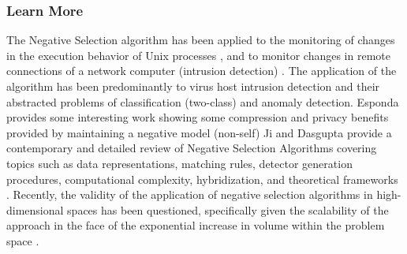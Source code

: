 % 
% 
\subsubsection{Learn More}
The Negative Selection algorithm has been applied to the monitoring of changes in the execution behavior of Unix processes \cite{Forrest1996, Hofmeyr1998}, and to monitor changes in remote connections of a network computer (intrusion detection) \cite{Hofmeyr1999, Hofmeyr1999a}. The application of the algorithm has been predominantly to virus host intrusion detection and their abstracted problems of classification (two-class) and anomaly detection.
Esponda provides some interesting work showing some compression and privacy benefits provided by maintaining a negative model (non-self) \cite{Darlington2005}
Ji and Dasgupta provide a contemporary and detailed review of Negative Selection Algorithms covering topics such as data representations, matching rules, detector generation procedures, computational complexity, hybridization, and theoretical frameworks \cite{Ji2007}.
Recently, the validity of the application of negative selection algorithms in high-dimensional spaces has been questioned, specifically given the scalability of the approach in the face of the exponential increase in volume within the problem space \cite{Stibor2006}.

